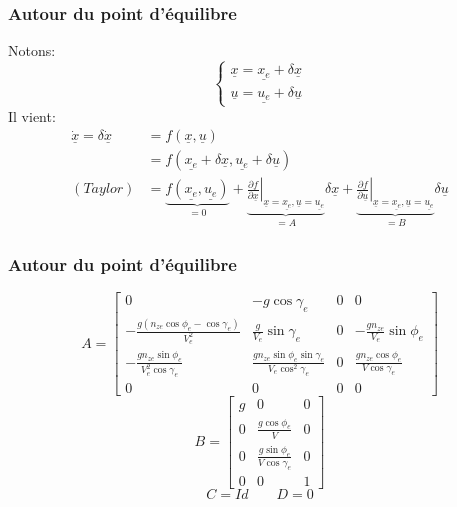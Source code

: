 \documentclass[footheight=2em]{beamer}
\begin{document}
\begin{frame}
    \frametitle{Autour du point d'équilibre}\pause{}
    Notons:
    \[
    \left \{
    \begin{array}{l}
        \underline{x} = \underline{x_e} + \delta \underline{x} \\
        \underline{u} = \underline{u_e} + \delta \underline{u}
    \end{array}
    \right.
    \]\pause{}
    Il vient:
    \begin{align*}
        \underline{\dot{x}} = \delta \underline{\dot{x}} &=
        f(\underline{x}, \underline{u}) \\
            &= f(\underline{x_e} + \delta \underline{x},
                 \underline{u_e} + \delta \underline{u}) \\
            (Taylor) &= \underbrace{f(\underline{x_e}, \underline{u_e})}_{=0} +
                        \underbrace
                        {
                        \left.
                        \frac{\partial f}{\partial \underline{x}}
                        \right| _{\underline{x} = \underline{x_e},
                                 \underline{u} = \underline{u_e}}
                        }_{=A}\delta \underline{x}
                        +
                        \underbrace
                        {
                         \left.
                         \frac{\partial f}{\partial \underline{u}}
                         \right| _{\underline{x} = \underline{x_e},
                                  \underline{u} = \underline{u_e}}
                        }_{=B}\delta \underline{u}
    \end{align*}
\end{frame}

\begin{frame}
    \frametitle{Autour du point d'équilibre}\pause{}
    \[
    A =
    \left[
    \begin{array}{cccc}
        0 & -g \cos \gamma_e & 0 & 0 \\
        -\frac{g(n_{ze} \cos \phi_e - \cos \gamma_e)}{V_e^2}
            & \frac{g}{V_e}\sin \gamma_e & 0
            & -\frac{gn_{ze}}{V_e}\sin \phi_e \\
        -\frac{gn_{ze} \sin \phi_e}{V_e^2 \cos \gamma_e}
            & \frac{gn_{ze} \sin \phi_e \sin \gamma_e}{V_e \cos^2 \gamma_e}
            & 0 & \frac{gn_{ze}\cos \phi_e}{V \cos \gamma_e} \\
        0 & 0 & 0 & 0
    \end{array}
    \right]
    \]\pause{}
    \[
    B =
    \left[
    \begin{array}{cccc}
        g & 0 & 0 \\
        0 & \frac{g\cos \phi_e}{V} & 0 \\
        0 & \frac{g\sin \phi_e}{V\cos \gamma_e} & 0 \\
        0 & 0 & 1
    \end{array}
    \right]
    \]\pause{}
    \[
    C = Id \qquad D = 0
    \]
\end{frame}
\end{document}
